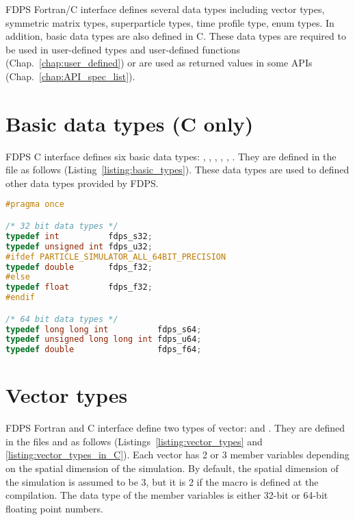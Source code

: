 FDPS Fortran/C interface defines several data types including vector types, symmetric matrix types, superparticle types, time profile type, enum types. In addition, basic data types are also defined in C. These data types are required to be used in user-defined types and user-defined functions (Chap.~\ref{chap:user_defined}) or are used as returned values in some APIs (Chap.~\ref{chap:API_spec_list}).

\section{Basic data types {\small (C only)}}
\label{sec:basic_types}
FDPS C interface defines six basic data types: , , , , , . They are defined in the file  as follows (Listing~\ref{listing:basic_types}). These data types are used to defined other data types provided by FDPS.

\begin{lstlisting}[language=C,caption=Basic data types (C only),label=listing:basic_types]
#pragma once

/* 32 bit data types */
typedef int          fdps_s32;
typedef unsigned int fdps_u32;
#ifdef PARTICLE_SIMULATOR_ALL_64BIT_PRECISION
typedef double       fdps_f32;
#else
typedef float        fdps_f32;
#endif

/* 64 bit data types */
typedef long long int          fdps_s64;
typedef unsigned long long int fdps_u64;
typedef double                 fdps_f64;
\end{lstlisting}


\section{Vector types}
\label{sec:vector_types}
FDPS Fortran and C interface define two types of vector:  and . They are defined in the files  and  as follows (Listings~\ref{listing:vector_types} and \ref{listing:vector_types_in_C}). Each vector has 2 or 3 member variables depending on the spatial dimension of the simulation. By default, the spatial dimension of the simulation is assumed to be 3, but it is 2 if the macro  is defined at the compilation. The data type of the member variables is either 32-bit or 64-bit floating point numbers.

